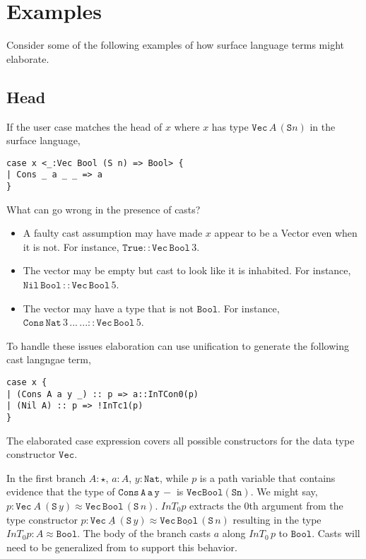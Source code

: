 \section{Examples}
 
Consider some of the following examples of how surface language terms might elaborate.
 
\subsection{Head}
 
If the user case matches the head of $x$ where $x$ has type $\mathtt{Vec}\,A\,(\mathtt{S}n)$ in the surface language,
 
\begin{lstlisting}[basicstyle={\ttfamily\small}]
case x <_:Vec Bool (S n) => Bool> {
| Cons _ a _ _ => a
}
\end{lstlisting}
 
What can go wrong in the presence of casts?
\begin{itemize}
\item
A faulty cast assumption may have made $x$ appear to be a Vector even when it is not.
For instance, $\mathtt{True}::\mathtt{Vec}\,\mathtt{Bool}\,3$.
\item
The vector may be empty but cast to look like it is inhabited.
For instance, $\mathtt{Nil}\,\mathtt{Bool}\,::\mathtt{Vec}\,\mathtt{Bool}\,5$.
\item
The vector may have a type that is not $\mathtt{Bool}$.
For instance, $\mathtt{Cons}\,\mathtt{Nat}\,3\,...\,...::\mathtt{Vec}\,\mathtt{Bool}\,5$.
\end{itemize}
 
To handle these issues elaboration can use unification to generate the following cast langngae term,
 
\begin{lstlisting}[basicstyle={\ttfamily\small}]
case x {
| (Cons A a y _) :: p => a::InTCon0(p)
| (Nil A) :: p => !InTc1(p)
}
\end{lstlisting}
 
The elaborated case expression covers all possible constructors for the data type constructor $\mathtt{Vec}$.
 
In the first branch $A:\star$, $a:A$, $y:\mathtt{Nat}$, while $p$ is a path variable that contains evidence that the type of $\mathtt{Cons\,A\,a\,y\,-}$ is $\mathtt{Vec Bool (S n)}$.
We might say, $p:\mathtt{Vec}\ A\ (\mathtt{S}\,y)\approx\mathtt{Vec}\,\mathtt{Bool}\,(\mathtt{S}\,n)$.
$InT_{0}p$ extracts the 0th argument from the type constructor $p:\mathtt{Vec}\ \underline{A}\ (\mathtt{S}\,y)\approx\mathtt{Vec}\,\underline{\mathtt{Bool}}\,(\mathtt{S}\,n)$ resulting in the type $InT_{0}p:A\approx\mathtt{Bool}$.
The body of the branch casts $a$ along $InT_{0}\,p$ to $\mathtt{Bool}$.
Casts will need to be generalized from  to support this behavior.
 
